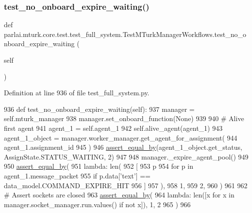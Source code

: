 \subsubsection{\texorpdfstring{test\+\_\+no\+\_\+onboard\+\_\+expire\+\_\+waiting()}{test\_no\_onboard\_expire\_waiting()}}
{\footnotesize\ttfamily def parlai.\+mturk.\+core.\+test.\+test\+\_\+full\+\_\+system.\+Test\+M\+Turk\+Manager\+Workflows.\+test\+\_\+no\+\_\+onboard\+\_\+expire\+\_\+waiting (\begin{DoxyParamCaption}\item[{}]{self }\end{DoxyParamCaption})}



Definition at line 936 of file test\+\_\+full\+\_\+system.\+py.


\begin{DoxyCode}
936     \textcolor{keyword}{def }test\_no\_onboard\_expire\_waiting(self):
937         manager = self.mturk\_manager
938         manager.set\_onboard\_function(\textcolor{keywordtype}{None})
939 
940         \textcolor{comment}{# Alive first agent}
941         agent\_1 = self.agent\_1
942         self.alive\_agent(agent\_1)
943         agent\_1\_object = manager.worker\_manager.get\_agent\_for\_assignment(
944             agent\_1.assignment\_id
945         )
946         \hyperlink{namespaceparlai_1_1mturk_1_1core_1_1test_1_1test__full__system_a0b463246d35658a2e422010f13dcf819}{assert\_equal\_by}(agent\_1\_object.get\_status, AssignState.STATUS\_WAITING, 2)
947 
948         manager.\_expire\_agent\_pool()
949 
950         \hyperlink{namespaceparlai_1_1mturk_1_1core_1_1test_1_1test__full__system_a0b463246d35658a2e422010f13dcf819}{assert\_equal\_by}(
951             \textcolor{keyword}{lambda}: len(
952                 [
953                     p
954                     \textcolor{keywordflow}{for} p \textcolor{keywordflow}{in} agent\_1.message\_packet
955                     \textcolor{keywordflow}{if} p.data[\textcolor{stringliteral}{'text'}] == data\_model.COMMAND\_EXPIRE\_HIT
956                 ]
957             ),
958             1,
959             2,
960         )
961 
962         \textcolor{comment}{# Assert sockets are closed}
963         \hyperlink{namespaceparlai_1_1mturk_1_1core_1_1test_1_1test__full__system_a0b463246d35658a2e422010f13dcf819}{assert\_equal\_by}(
964             \textcolor{keyword}{lambda}: len([x \textcolor{keywordflow}{for} x \textcolor{keywordflow}{in} manager.socket\_manager.run.values() \textcolor{keywordflow}{if} \textcolor{keywordflow}{not} x]), 1, 2
965         )
966 
\end{DoxyCode}
